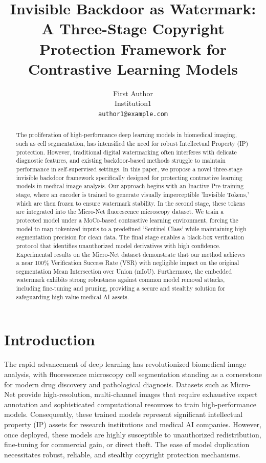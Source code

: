 \documentclass[10pt,twocolumn,letterpaper]{article}
\title{Invisible Backdoor as Watermark: A Three-Stage Copyright Protection Framework for Contrastive Learning Models}
\author{
First Author\\
Institution1\\
{\tt\small author1@example.com}
}
\begin{document}
\maketitle

\begin{abstract}
The proliferation of high-performance deep learning models in biomedical imaging, such as cell segmentation, has intensified the need for robust Intellectual Property (IP) protection. However, traditional digital watermarking often interferes with delicate diagnostic features, and existing backdoor-based methods struggle to maintain performance in self-supervised settings. In this paper, we propose a novel three-stage invisible backdoor framework specifically designed for protecting contrastive learning models in medical image analysis. Our approach begins with an Inactive Pre-training stage, where an encoder is trained to generate visually imperceptible 'Invisible Tokens,' which are then frozen to ensure watermark stability. In the second stage, these tokens are integrated into the Micro-Net fluorescence microscopy dataset. We train a protected model under a MoCo-based contrastive learning environment, forcing the model to map tokenized inputs to a predefined 'Sentinel Class' while maintaining high segmentation precision for clean data. The final stage enables a black-box verification protocol that identifies unauthorized model derivatives with high confidence. Experimental results on the Micro-Net dataset demonstrate that our method achieves a near 100\% Verification Success Rate (VSR) with negligible impact on the original segmentation Mean Intersection over Union (mIoU). Furthermore, the embedded watermark exhibits strong robustness against common model removal attacks, including fine-tuning and pruning, providing a secure and stealthy solution for safeguarding high-value medical AI assets.
\end{abstract}

\section{Introduction}
The rapid advancement of deep learning has revolutionized biomedical image analysis, with fluorescence microscopy cell segmentation standing as a cornerstone for modern drug discovery and pathological diagnosis. Datasets such as Micro-Net provide high-resolution, multi-channel images that require exhaustive expert annotation and sophisticated computational resources to train high-performance models. Consequently, these trained models represent significant intellectual property (IP) assets for research institutions and medical AI companies. However, once deployed, these models are highly susceptible to unauthorized redistribution, fine-tuning for commercial gain, or direct theft. The ease of model duplication necessitates robust, reliable, and stealthy copyright protection mechanisms.
\end{document}
